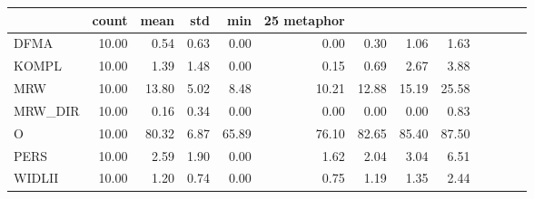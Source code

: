 \begin{tabular}{lrrrrrrrr}
\toprule
 & count & mean & std & min & 25%
metaphor &  &  &  &  &  &  &  &  \\
\midrule
DFMA & 10.00 & 0.54 & 0.63 & 0.00 & 0.00 & 0.30 & 1.06 & 1.63 \\
KOMPL & 10.00 & 1.39 & 1.48 & 0.00 & 0.15 & 0.69 & 2.67 & 3.88 \\
MRW & 10.00 & 13.80 & 5.02 & 8.48 & 10.21 & 12.88 & 15.19 & 25.58 \\
MRW\_DIR & 10.00 & 0.16 & 0.34 & 0.00 & 0.00 & 0.00 & 0.00 & 0.83 \\
O & 10.00 & 80.32 & 6.87 & 65.89 & 76.10 & 82.65 & 85.40 & 87.50 \\
PERS & 10.00 & 2.59 & 1.90 & 0.00 & 1.62 & 2.04 & 3.04 & 6.51 \\
WIDLII & 10.00 & 1.20 & 0.74 & 0.00 & 0.75 & 1.19 & 1.35 & 2.44 \\
\bottomrule
\end{tabular}
